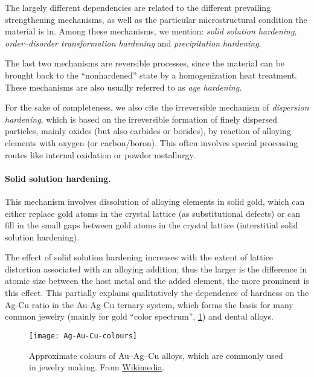 The largely different dependencies are related to the different prevailing strengthening mechanisms, as well as the particular microstructural condition the material is in. Among these mechanisms, we mention: \textit{solid solution hardening}, \textit{order--disorder transformation hardening} and \textit{precipitation hardening}.

The last two mechanisms are reversible processes, since the material can be brought back to the ``nonhardened'' state by a homogenization heat treatment. These mechanisms are also usually referred to as \textit{age hardening}.

For the sake of completeness, we also cite the irreversible mechanism of \textit{dispersion hardening}, which is based on the irreversible formation of finely dispersed particles, mainly oxides (but also carbides or borides), by reaction of alloying elements with oxygen (or carbon/boron). This often involves special processing routes like internal oxidation or powder metallurgy.

\paragraph{Solid solution hardening.} This mechanism involves dissolution of alloying elements in solid gold, which can either replace gold atoms in the crystal lattice (as substitutional defects) or can fill in the small gaps between gold atoms in the crystal lattice (interstitial solid solution hardening).

The effect of solid solution hardening increases with the extent of lattice distortion associated with an alloying addition; thus the larger is the difference in atomic size between the host metal and the added element, the more prominent is this effect. This partially explains qualitatively the dependence of hardness on the Ag-Cu ratio in the Au-Ag-Cu ternary system, which forms the basis for many common jewelry (mainly for gold ``color spectrum'', \cref{fig:AuAgCu}) and dental alloys.
\begin{figure}[tb]
    \centering
    \texttt{[image: Ag-Au-Cu-colours]}
    \caption{Approximate colours of Au--Ag--Cu alloys, which are commonly used in jewelry making. From \href{https://commons.wikimedia.org/wiki/File:Ag-Au-Cu-colours.png}{\ttfamily Wikimedia}.}
    \label{fig:AuAgCu}
\end{figure}

